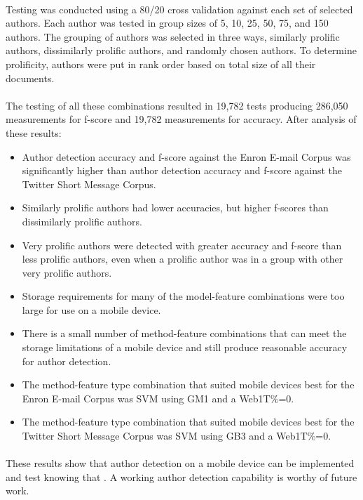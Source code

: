 	\paragraph*{} Testing was conducted using a 80/20 cross validation against each set of selected authors.  Each author was tested in group sizes of 5, 10, 25, 50, 75, and 150 authors.  The grouping of authors was selected in three ways, similarly prolific authors, dissimilarly prolific authors, and randomly chosen authors.  To determine prolificity, authors were put in rank order based on total size of all their documents.

	\paragraph*{} The testing of all these combinations resulted in 19,782 tests producing 286,050 measurements for f-score and 19,782 measurements for accuracy.  After analysis of these results:
\begin{itemize} 
	\item Author detection accuracy and f-score against the Enron E-mail Corpus was significantly higher than author detection accuracy and f-score against the Twitter Short Message Corpus.  	
	\item Similarly prolific authors had lower accuracies, but higher f-scores than dissimilarly prolific authors.  
	\item Very prolific authors were detected with greater accuracy and f-score than less prolific authors, even when a prolific author was in a group with other very prolific authors.  
	\item Storage requirements for many of the model-feature combinations were too large for use on a mobile device.
	\item There is a small number of method-feature combinations that can meet the storage limitations of a mobile device and still produce reasonable accuracy for author detection.
	\item The method-feature type combination that suited mobile devices best for the Enron E-mail Corpus was SVM using GM1 and a Web1T\%=0.
	\item The method-feature type combination that suited mobile devices best for the Twitter Short Message Corpus was SVM using GB3 and a Web1T\%=0.
\end{itemize}
	
	\paragraph*{} These results show that author detection on a mobile device can be implemented and test knowing that .  A working author detection capability is worthy of future work.

